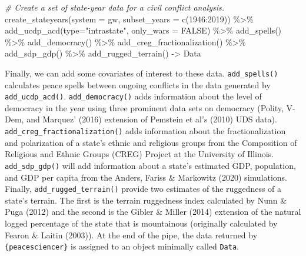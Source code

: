 \documentclass[
  11pt,
]{article}
\newenvironment{Shaded}{\begin{snugshade}}{\end{snugshade}}
\newcommand{\AttributeTok}[1]{\textcolor[rgb]{0.77,0.63,0.00}{#1}}
\newcommand{\CommentTok}[1]{\textcolor[rgb]{0.56,0.35,0.01}{\textit{#1}}}
\newcommand{\ConstantTok}[1]{\textcolor[rgb]{0.00,0.00,0.00}{#1}}
\newcommand{\DecValTok}[1]{\textcolor[rgb]{0.00,0.00,0.81}{#1}}
\newcommand{\FunctionTok}[1]{\textcolor[rgb]{0.00,0.00,0.00}{#1}}
\newcommand{\NormalTok}[1]{#1}
\newcommand{\OtherTok}[1]{\textcolor[rgb]{0.56,0.35,0.01}{#1}}
\newcommand{\SpecialCharTok}[1]{\textcolor[rgb]{0.00,0.00,0.00}{#1}}
\newcommand{\StringTok}[1]{\textcolor[rgb]{0.31,0.60,0.02}{#1}}
\begin{document}
\begin{Shaded}
\begin{Highlighting}[]
\CommentTok{\# Create a set of state{-}year data for a civil conflict analysis.}
\FunctionTok{create\_stateyears}\NormalTok{(}\AttributeTok{system =} \StringTok{\textquotesingle{}gw\textquotesingle{}}\NormalTok{, }\AttributeTok{subset\_years =} \FunctionTok{c}\NormalTok{(}\DecValTok{1946}\SpecialCharTok{:}\DecValTok{2019}\NormalTok{)) }\SpecialCharTok{\%\textgreater{}\%}
  \FunctionTok{add\_ucdp\_acd}\NormalTok{(}\AttributeTok{type=}\StringTok{"intrastate"}\NormalTok{, }\AttributeTok{only\_wars =} \ConstantTok{FALSE}\NormalTok{) }\SpecialCharTok{\%\textgreater{}\%}
  \FunctionTok{add\_spells}\NormalTok{() }\SpecialCharTok{\%\textgreater{}\%}
  \FunctionTok{add\_democracy}\NormalTok{() }\SpecialCharTok{\%\textgreater{}\%}
  \FunctionTok{add\_creg\_fractionalization}\NormalTok{() }\SpecialCharTok{\%\textgreater{}\%}
  \FunctionTok{add\_sdp\_gdp}\NormalTok{() }\SpecialCharTok{\%\textgreater{}\%}
  \FunctionTok{add\_rugged\_terrain}\NormalTok{() }\OtherTok{{-}\textgreater{}}\NormalTok{ Data}
\end{Highlighting}
\end{Shaded}

Finally, we can add some covariates of interest to these data. \texttt{add\_spells()} calculates peace spells between ongoing conflicts in the data generated by \texttt{add\_ucdp\_acd()}. \texttt{add\_democracy()} adds information about the level of democracy in the year using three prominent data sets on democracy (Polity, V-Dem, and Marquez' (2016) extension of Pemstein et al's (2010) UDS data). \texttt{add\_creg\_fractionalization()} adds information about the fractionalization and polarization of a state's ethnic and religious groups from the Composition of Religious and Ethnic Groups (CREG) Project at the University of Illinois. \texttt{add\_sdp\_gdp()} will add information about a state's estimated GDP, population, and GDP per capita from the Anders, Fariss \& Markowitz (2020) simulations. Finally, \texttt{add\_rugged\_terrain()} provide two estimates of the ruggedness of a state's terrain. The first is the terrain ruggedness index calculated by Nunn \& Puga (2012) and the second is the Gibler \& Miller (2014) extension of the natural logged percentage of the state that is mountainous (originally calculated by Fearon \& Laitin (2003)). At the end of the pipe, the data returned by \texttt{\{peacesciencer\}} is assigned to an object minimally called \texttt{Data}.
\end{document}

